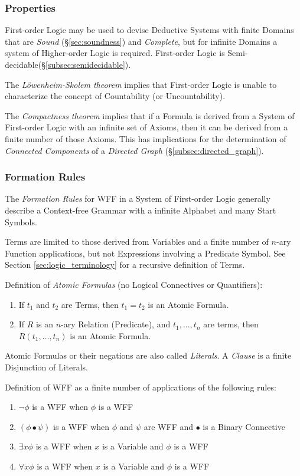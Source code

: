 \documentclass{article}
\begin{document}
\subsubsection{Properties}\label{subsec:first_order_properties}

First-order Logic may be used to devise Deductive Systems with finite
Domains that are \emph{Sound} (\S\ref{sec:soundness}) and
\emph{Complete}, but for infinite Domains a system of Higher-order
Logic is required. First-order Logic is
Semi-decidable(\S\ref{subsec:semidecidable}).

The \emph{L\"owenheim-Skolem theorem} implies that First-order Logic
is unable to characterize the concept of Countability (or
Uncountability).

The \emph{Compactness theorem} implies that if a Formula is derived
from a System of First-order Logic with an infinite set of Axioms,
then it can be derived from a finite number of those Axioms. This has
implications for the determination of \emph{Connected Components} of a
\emph{Directed Graph} (\S\ref{subsec:directed_graph}).

\subsubsection{Formation Rules}\label{subsec:formation_rules}

The \emph{Formation Rules} for WFF in a System of First-order Logic
generally describe a Context-free Grammar with a infinite Alphabet and
many Start Symbols.

Terms are limited to those derived from Variables and a finite number
of $n$-ary Function applications, but not Expressions involving a
Predicate Symbol. See Section \ref{sec:logic_terminology} for a recursive
definition of Terms.

Definition of \emph{Atomic Formulas} (no Logical Connectives or Quantifiers):
\begin{enumerate}
\item If $t_1$ and $t_2$ are Terms, then $t_1 = t_2$ is an Atomic Formula.
\item If $R$ is an $n$-ary Relation (Predicate), and $t_1,\ldots,t_n$
  are terms, then $R(t_1,\ldots,t_n)$ is an Atomic Formula.
\end{enumerate}
Atomic Formulas or their negations are also called \emph{Literals}. A
\emph{Clause} is a finite Disjunction of Literals.

Definition of WFF as a finite number of applications of the following rules:
\begin{enumerate}
\item $\neg \phi$ is a WFF when $\phi$ is a WFF
\item $(\phi \bullet \psi)$ is a WFF when $\phi$ and $\psi$ are WFF
  and $\bullet$ is a Binary Connective
\item $\exists x \phi$ is a WFF when $x$ is a Variable and $\phi$ is a WFF
\item $\forall x \phi$ is a WFF when $x$ is a Variable and $\phi$ is a WFF
\end{enumerate}
\end{document}
